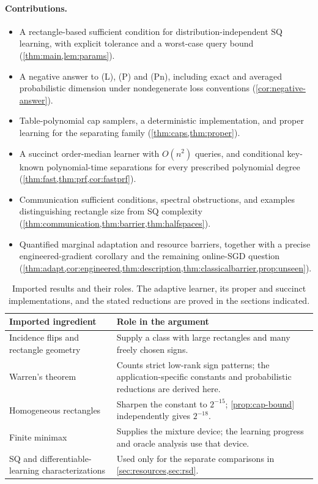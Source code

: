 \paragraph{Contributions.}
\begin{itemize}[leftmargin=*,itemsep=2pt]
\item A rectangle-based sufficient condition for distribution-independent SQ learning, with explicit tolerance and a worst-case query bound (\cref{thm:main,lem:params}).
\item A negative answer to (L), (P) and (Pn), including exact and averaged probabilistic dimension under nondegenerate loss conventions (\cref{cor:negative-answer}).
\item Table-polynomial cap samplers, a deterministic implementation, and proper learning for the separating family (\cref{thm:caps,thm:proper}).
\item A succinct order-median learner with $O(n^2)$ queries, and conditional key-known polynomial-time separations for every prescribed polynomial degree (\cref{thm:fast,thm:prf,cor:fastprf}).
\item Communication sufficient conditions, spectral obstructions, and examples distinguishing rectangle size from SQ complexity (\cref{thm:communication,thm:barrier,thm:halfspaces}).
\item Quantified marginal adaptation and resource barriers, together with a precise engineered-gradient corollary and the remaining online-SGD question (\cref{thm:adapt,cor:engineered,thm:description,thm:classicalbarrier,prop:unseen}).
\end{itemize}

\begin{table}[t]
\centering\small
\begin{tabularx}{\linewidth}{@{}p{.30\linewidth}X@{}}
\toprule
Imported ingredient & Role in the argument\\\midrule
Incidence flips and rectangle geometry \citep{HHPTZ22} & Supply a class with large rectangles and many freely chosen signs.\\
Warren's theorem \citep{Warren68,AMY16} & Counts strict low-rank sign patterns; the application-specific constants and probabilistic reductions are derived here.\\
Homogeneous rectangles \citep{APP05,HHPTZ22} & Sharpen the constant to $2^{-15}$; \cref{prop:cap-bound} independently gives $2^{-18}$.\\
Finite minimax \citep{HHPTZ22} & Supplies the mixture device; the learning progress and oracle analysis use that device.\\
SQ and differentiable-learning characterizations \citep{Feldman17,AKMSS21} & Used only for the separate comparisons in \cref{sec:resources,sec:rsd}.\\
\bottomrule
\end{tabularx}
\caption{Imported results and their roles. The adaptive learner, its proper and succinct implementations, and the stated reductions are proved in the sections indicated.}\label{tab:imports}
\end{table}

